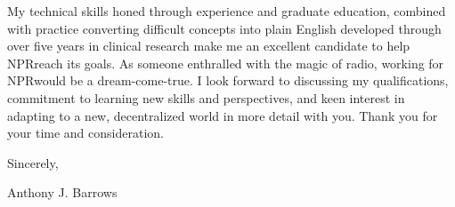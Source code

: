 \documentclass[letterpaper,11pt]{article}
\newcommand{\company}{NPR}
\newcommand{\actionStatment}{
	My technical skills honed through experience and graduate education, combined with practice converting difficult concepts into plain English developed through over five years in clinical research make me an excellent candidate to help \company \space reach its goals. As someone enthralled with the magic of radio, working for \company \space would be a dream-come-true.
}
\begin{document}
	\actionStatment I look forward to discussing my qualifications, commitment to learning new skills and perspectives, and keen interest in adapting to a new, decentralized world in more detail with you. Thank you for your time and consideration.
	
	\vspace{5mm}
	
	Sincerely,
	\vspace{3mm}
	
	Anthony J. Barrows
\end{document}
